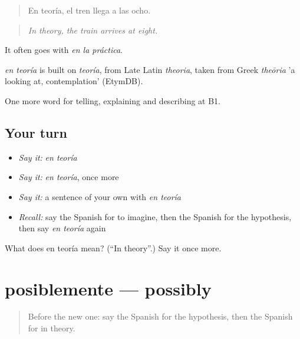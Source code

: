 \begin{quote}
En teoría, el tren llega a las ocho.
\end{quote}

\begin{quote}
\emph{In theory, the train arrives at eight.}
\end{quote}

It often goes with \emph{en la práctica}.

\begin{cousinweb}
\emph{en teoría} is built on \emph{teoría}, from Late Latin \emph{theoria}, taken from Greek \emph{theōria} 'a looking at, contemplation' (EtymDB).
\end{cousinweb}

\begin{grammarlens}[title={What you've built}]
One more word for telling, explaining and describing at B1.
\end{grammarlens}

\subsection*{Your turn}
\begin{itemize}
\raggedright
  \item \emph{Say it:} \emph{en teoría}
  \item \emph{Say it:} \emph{en teoría}, once more
  \item \emph{Say it:} a sentence of your own with \emph{en teoría}
  \item \emph{Recall:} say the Spanish for to imagine, then the Spanish for the hypothesis, then say \emph{en teoría} again
\end{itemize}

\begin{tcolorbox}[breakable,colback=teal!4,colframe=teal!35!black,title={Before you move on}]
What does en teoría mean? (\textquotedblleft{}In theory\textquotedblright{}.) Say it once more.
\end{tcolorbox}
\section[posiblemente]{posiblemente — possibly}

\label{lesson:ES-C618-posiblemente}



\begin{quote}
Before the new one: say the Spanish for the hypothesis, then the Spanish for in theory.
\end{quote}

